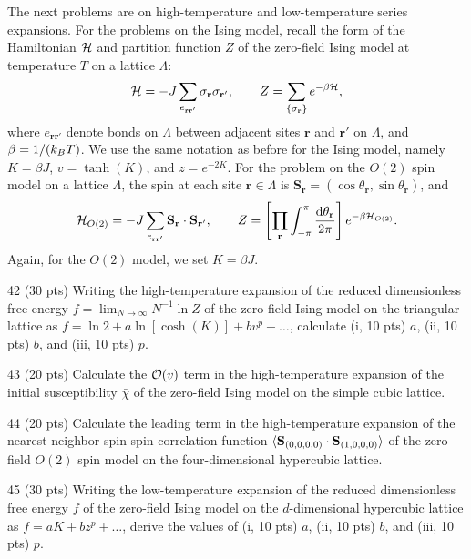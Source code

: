 The next problems are on high-temperature and low-temperature series expansions. For the problems on the Ising model,
recall the form of the Hamiltonian $\mathcal{H}$ and partition function $Z$ of the zero-field Ising model at temperature $T$ on
a lattice $\Lambda$:
\begin{equation}
  \mathcal{H} = -J\sum_{e_{\mathbf r\mathbf r'}}\sigma_{\mathbf r}\sigma_{\mathbf r'},\qquad
  Z = \sum_{\{\sigma_{\mathbf r}\}}e^{-\beta\mathcal{H}},
\end{equation}
where $e_{\mathbf r\mathbf r'}$ denote bonds on $\Lambda$ between adjacent sites $\mathbf r$ and $\mathbf r'$ on
$\Lambda$, and $\beta = 1/(k_{B} T)$. We use the same notation as before for the Ising model, namely $K = \beta J$,
$v = \tanh(K)$, and $z = e^{-2K}$. For the problem on the $O(2)$ spin model on a lattice $\Lambda$, the spin at each site
$\mathbf r\in\Lambda$ is $\mathbf S_{\mathbf r} = (\cos\theta_{\mathbf r},\sin\theta_{\mathbf r})$, and
\begin{equation}
  \mathcal{H}_{O(2)} = -J\sum_{e_{\mathbf r\mathbf r'}}\mathbf S_{\mathbf r}\cdot\mathbf S_{\mathbf r'},\qquad
  Z = \left[\prod_{\mathbf r}\int_{-\pi}^{\pi}\frac{\mathop{}\!\mathrm{d}\theta_{\mathbf r}}{2\pi}\right]e^{-\beta\mathcal{H}_{O(2)}}.
\end{equation}
Again, for the $O(2)$ model, we set $K = \beta J$.

\begin{hwproblem}{4}{2}
(30 pts) Writing the high-temperature expansion of the reduced dimensionless free energy
$f = \lim_{N\to\infty}N^{-1}\ln Z$ of the zero-field Ising model on the triangular lattice as
$f = \ln 2+a\ln[\cosh(K)]+bv^p+\ldots$, calculate (i, 10 pts) $a$, (ii, 10 pts) $b$, and (iii, 10 pts) $p$.
\end{hwproblem}

\begin{hwproblem}{4}{3}
(20 pts) Calculate the $\mathcal{O}(v)$ term in the high-temperature expansion of the initial susceptibility $\bar\chi$ of
the zero-field Ising model on the simple cubic lattice.
\end{hwproblem}

\begin{hwproblem}{4}{4}
(20 pts) Calculate the leading term in the high-temperature expansion of the nearest-neighbor spin-spin correlation
function $\langle \mathbf S_{(0,0,0,0)}\cdot\mathbf S_{(1,0,0,0)}\rangle$ of the zero-field $O(2)$ spin model on the
four-dimensional hypercubic lattice.
\end{hwproblem}

\begin{hwproblem}{4}{5}
(30 pts) Writing the low-temperature expansion of the reduced dimensionless free energy $f$ of the zero-field Ising
model on the $d$-dimensional hypercubic lattice as $f = aK+bz^p+\ldots$, derive the values of (i, 10 pts) $a$, (ii, 10
pts) $b$, and (iii, 10 pts) $p$.
\end{hwproblem}
